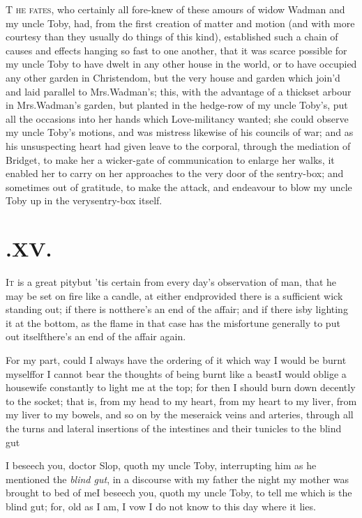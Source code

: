\documentclass{article}
\begin{document}
\lettrine{T}{ he fates}, who certainly all
fore-knew of these amours of widow Wadman and my uncle
Toby, had, from the first creation of matter and motion (and
with more courtesy than they usually do things of this kind),
established such a chain of causes and effects hanging so fast to
one another, that it was scarce possible for my uncle Toby
to have dwelt in any other house in the world, or to have occupied
any other garden in Christendom, but the very house and
garden which join’d and laid parallel to Mrs.\@ Wadman’s; this, with the advantage of a thickset
arbour in Mrs.\@ Wadman’s garden, but planted in the
hedge-row of my uncle Toby’s, put all the occasions
into her hands which Love-militancy wanted; she could observe my uncle Toby’s motions, and
was mistress likewise of his councils of war; and as his
unsuspecting heart had given leave to the corporal, through the
mediation of Bridget, to make her a wicker-gate of
communication to enlarge her walks, it enabled her to carry on her
approaches to the very door of the sentry-box; and sometimes out of
gratitude, to make the attack, and endeavour to blow my uncle
Toby up in the very\break sentry-box itself.

\vfill{}\eject
\section{.\enspace XV.}

\lettrine{I}{t} is a great pity\tsh but
’tis certain from every day’s observation of man, that
he may be set on fire like a candle, at either end\tsk provided
there is a sufficient wick standing out; if there is
not\break\tsk there’s an end of the affair; and if there
is\tsk by lighting it at the bottom, as the flame in that case
has the misfortune generally to put out itself\tsk there’s
an end of the affair again.

For my part, could I always have the ordering of it which way I
would be burnt myself\tsk for I cannot bear the thoughts of being
burnt like a beast\tsk\break I would oblige a housewife constantly to
light me at the top; for then I should burn down decently to the
socket; that is, from my head to my heart, from my heart to my
liver, from my liver to my bowels, and so on by the meseraick veins
and arteries, through all the turns and lateral insertions of the
intestines and\break
their tunicles to the blind gut\tsh

\noindent
\tsh I beseech you, doctor Slop, quoth my uncle
Toby, interrupting him as he mentioned the \textit{blind gut},
in a discourse with my father the night my mother was brought to
bed of me\tsh I beseech you, quoth my uncle Toby,
to tell me which is the blind gut; for, old as I am, I vow I do not
know to this day where it lies.
\end{document}
